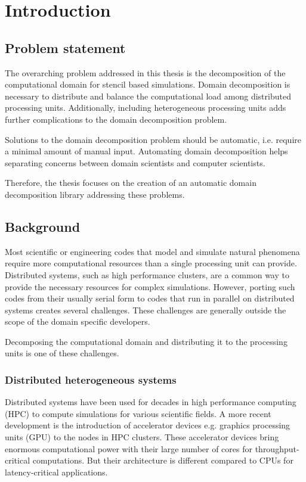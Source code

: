 \section{Introduction}
\subsection{Problem statement}
The overarching problem addressed in this thesis is the decomposition of the computational domain for stencil based simulations.
Domain decomposition is necessary to distribute and balance the computational load among distributed processing units.
Additionally, including heterogeneous processing units adds further complications to the domain decomposition problem.

Solutions to the domain decomposition problem should be automatic, i.e. require a minimal amount of manual input.
Automating domain decomposition helps separating concerns between domain scientists and computer scientists.

Therefore, the thesis focuses on the creation of an automatic domain decomposition library addressing these problems.

\subsection{Background}
Most scientific or engineering codes that model and simulate natural phenomena require more computational resources than a single processing unit can provide.
Distributed systems, such as high performance clusters, are a common way to provide the necessary resources for complex simulations.
However, porting such codes from their usually serial form to codes that run in parallel on distributed systems creates several challenges.
These challenges are generally outside the scope of the domain specific developers.

Decomposing the computational domain and distributing it to the processing units is one of these challenges.

\subsubsection{Distributed heterogeneous systems}
Distributed systems have been used for decades in high performance computing (HPC) to compute simulations for various scientific fields.
A more recent development is the introduction of accelerator devices e.g. graphics processing units (GPU) to the nodes in HPC clusters.
These accelerator devices bring enormous computational power with their large number of cores for throughput-critical computations.
But their architecture is different compared to CPUs for latency-critical applications.

